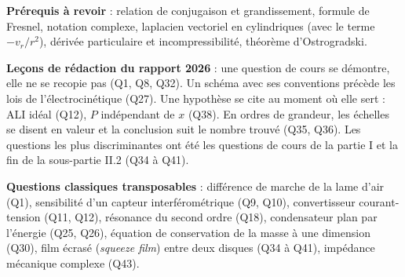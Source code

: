 \documentclass[11pt,a4paper]{article}
\begin{document}
\textbf{Prérequis à revoir} : relation de conjugaison et grandissement, formule de Fresnel, notation complexe, laplacien vectoriel en cylindriques (avec le terme \(-v_r/r^2\)), dérivée particulaire et incompressibilité, théorème d'Ostrogradski.

\textbf{Leçons de rédaction du rapport 2026} : une question de cours se démontre, elle ne se recopie pas (Q1, Q8, Q32). Un schéma avec ses conventions précède les lois de l'électrocinétique (Q27). Une hypothèse se cite au moment où elle sert : ALI idéal (Q12), \(P\) indépendant de \(x\) (Q38). En ordres de grandeur, les échelles se disent en valeur et la conclusion suit le nombre trouvé (Q35, Q36). Les questions les plus discriminantes ont été les questions de cours de la partie I et la fin de la sous-partie II.2 (Q34 à Q41).

\textbf{Questions classiques transposables} : différence de marche de la lame d'air (Q1), sensibilité d'un capteur interférométrique (Q9, Q10), convertisseur courant-tension (Q11, Q12), résonance du second ordre (Q18), condensateur plan par l'énergie (Q25, Q26), équation de conservation de la masse à une dimension (Q30), film écrasé (\emph{squeeze film}) entre deux disques (Q34 à Q41), impédance mécanique complexe (Q43).
\end{document}
